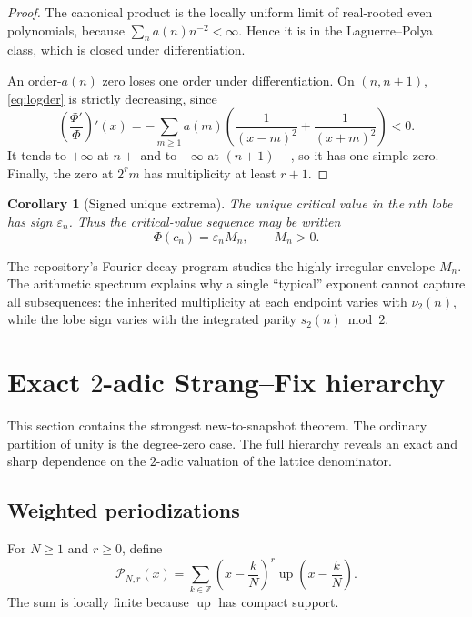 \documentclass[11pt,oneside]{article}
\numberwithin{equation}{section}
\newtheorem{corollary}[theorem]{Corollary}
\theoremstyle{definition}
\theoremstyle{remark}
\newcommand{\Z}{\mathbb Z}
\newcommand{\Up}{\operatorname{up}}
\begin{document}
\begin{proof}
The canonical product is the locally uniform limit of real-rooted even
polynomials, because $\sum_n a(n)n^{-2}<\infty$.  Hence it is in the
Laguerre--Polya class, which is closed under differentiation.

An order-$a(n)$ zero loses one order under differentiation.  On $(n,n+1)$,
\eqref{eq:logder} is strictly decreasing, since
\[
 \left(\frac{\Phi'}{\Phi}\right)'(x)
 =-\sum_{m\ge1}a(m)\left(\frac1{(x-m)^2}+\frac1{(x+m)^2}\right)<0.
\]
It tends to $+\infty$ at $n+$ and to $-\infty$ at $(n+1)-$, so it has one
simple zero.  Finally, the zero at $2^rm$ has multiplicity at least $r+1$.
\end{proof}

\begin{corollary}[Signed unique extrema]
The unique critical value in the $n$th lobe has sign $\varepsilon_n$.  Thus the
critical-value sequence may be written
\begin{equation}
 \Phi(c_n)=\varepsilon_n M_n,\qquad M_n>0.                 \label{eq:critical-sign}
\end{equation}
\end{corollary}

The repository's Fourier-decay program studies the highly irregular envelope
$M_n$.  The arithmetic spectrum explains why a single ``typical'' exponent cannot
capture all subsequences: the inherited multiplicity at each endpoint varies
with $\nu_2(n)$, while the lobe sign varies with the integrated parity
$s_2(n)\bmod2$.

\section{Exact $2$-adic Strang--Fix hierarchy}
\label{sec:weighted}

This section contains the strongest new-to-snapshot theorem.  The ordinary
partition of unity is the degree-zero case.  The full hierarchy reveals an exact
and sharp dependence on the $2$-adic valuation of the lattice denominator.

\subsection{Weighted periodizations}

For $N\ge1$ and $r\ge0$, define
\begin{equation}
 \mathcal P_{N,r}(x)=
 \sum_{k\in\Z}\left(x-\frac{k}{N}\right)^r
 \Up\!\left(x-\frac{k}{N}\right).                         \label{eq:periodization}
\end{equation}
The sum is locally finite because $\Up$ has compact support.
\end{document}
